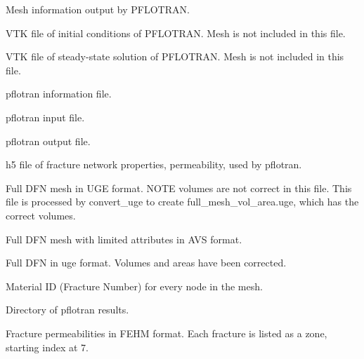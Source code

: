 \documentclass[letterpaper,10pt,english]{sphinxmanual}
\begin{document}
\label{\detokenize{output:cellinfo-dat}}
Mesh information output by PFLOTRAN.

\label{\detokenize{output:dfn-explicit-000-vtk}}
VTK file of initial conditions of PFLOTRAN. Mesh is not included in this file.

\label{\detokenize{output:dfn-explicit-001-vtk}}
VTK file of steady-state solution of PFLOTRAN. Mesh is not included in this file.

\label{\detokenize{output:dfn-explicit-mas-dat}}
pflotran information file.

\label{\detokenize{output:dfn-explicit-in}}
pflotran input file.

\label{\detokenize{output:dfn-explicit-out}}
pflotran output file.

\label{\detokenize{output:dfn-properties-h5}}
h5 file of fracture network properties, permeability, used by pflotran.

\label{\detokenize{output:full-mesh-uge}}
Full DFN mesh in UGE format. NOTE volumes are not correct in this file. This file is processed by convert\_uge to create full\_mesh\_vol\_area.uge, which has the correct volumes.

\label{\detokenize{output:full-mesh-viz-inp}}
Full DFN mesh with limited attributes in AVS format.

\label{\detokenize{output:full-mesh-vol-area-uge}}
Full DFN in uge format. Volumes and areas have been corrected.

\label{\detokenize{output:materialid-dat}}
Material ID (Fracture Number) for every node in the mesh.

\label{\detokenize{output:parsed-vtk}}
Directory of pflotran results.

\label{\detokenize{output:perm-dat}}
Fracture permeabilities in FEHM format. Each fracture is listed as a zone, starting index at 7.
\end{document}
